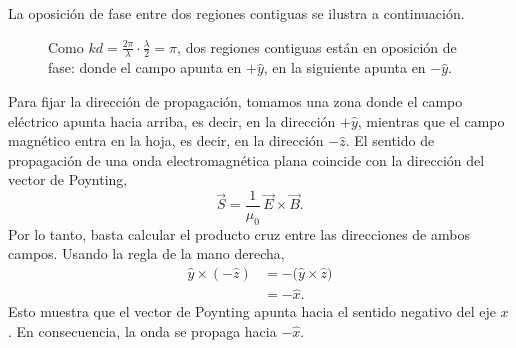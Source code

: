 \documentclass[11pt]{article}
\begin{document}
La oposici\'on de fase entre dos regiones contiguas se ilustra a continuaci\'on.

\begin{figure}[H]
\centering
{}
\caption{Como $kd=\tfrac{2\pi}{\lambda}\cdot\tfrac{\lambda}{2}=\pi$, dos regiones contiguas est\'an en oposici\'on de fase: donde el campo apunta en $+\hat y$, en la siguiente apunta en $-\hat y$.}
\end{figure}

Para fijar la direcci\'on de propagaci\'on, tomamos una zona donde el campo el\'ectrico apunta hacia arriba, es decir, en la direcci\'on $+\hat{y}$, mientras que el campo magn\'etico entra en la hoja, es decir, en la direcci\'on $-\hat{z}$. El sentido de propagaci\'on de una onda electromagn\'etica plana coincide con la direcci\'on del vector de Poynting,
\begin{equation}
    \vec S=\frac{1}{\mu_0}\,\vec E\times\vec B.
    \label{eq:p5_poynting}
\end{equation}
Por lo tanto, basta calcular el producto cruz entre las direcciones de ambos campos. Usando la regla de la mano derecha,
\begin{align*}
    \hat{y}\times(-\hat{z})
    &=-\bigl(\hat{y}\times\hat{z}\bigr)\\
    &=-\hat{x}.
\end{align*}
Esto muestra que el vector de Poynting apunta hacia el sentido negativo del eje $x$. En consecuencia, la onda se propaga hacia $-\hat{x}$.
\end{document}
